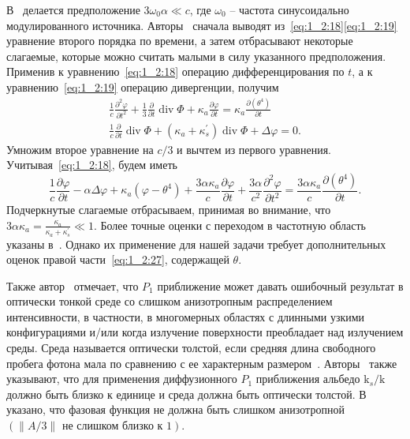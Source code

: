 В~\cite{FishkinGratton1993, HaskellEtAl1994} делается предположение
$3 \omega_{0} \alpha \ll c$, где $\omega_{0}$ -- частота
синусоидально модулированного источника.
Авторы~\cite{Boas1996, HaskellEtAl1994} сначала выводят
из~\eqref{eq:1_2:18}\eqref{eq:1_2:19} уравнение
второго порядка по времени,
а затем отбрасывают некоторые слагаемые, которые можно считать
малыми в силу указанного предположения.
Применив к уравнению~\eqref{eq:1_2:18} операцию дифференцирования
по $t$, а к уравнению~\eqref{eq:1_2:19} операцию дивергенции, получим
\[
    \begin{gathered}
        \frac{1}{c} \frac{\partial^{2} \varphi}{\partial t^{2}}+\frac{1}{3}
        \frac{\partial}{\partial t} \operatorname{div} \Phi+
        \kappa_{a} \frac{\partial \varphi}{\partial t}=\kappa_{a}
        \frac{\partial\left(\theta^{4}\right)}{\partial t} \\
        \frac{1}{c} \frac{\partial}{\partial t} \operatorname{div}
        \Phi+\left(\kappa_{a}+\kappa_{s}^{\prime}\right)
        \operatorname{div} \Phi+\Delta \varphi=0.
    \end{gathered}
\]
Умножим второе уравнение на $c/3$ и вычтем из первого уравнения.
Учитывая~\eqref{eq:1_2:18}, будем иметь
\begin{equation}
    \label{eq:1_2:27}
    \frac{1}{c} \frac{\partial \varphi}{\partial t}-\alpha \Delta
    \varphi+\kappa_{a}\left(\varphi-\theta^{4}\right)+\frac{3 \alpha \kappa_{a}}{c}
    \frac{\partial \varphi}{\partial t}+\frac{3 \alpha}{c^{2}}
    \frac{\partial^{2} \varphi}{\partial t^{2}}=\frac{3 \alpha \kappa_{a}}{c}
    \frac{\partial\left(\theta^{4}\right)}{\partial t}.
\end{equation}
Подчеркнутые слагаемые отбрасываем, принимая во внимание,
что $3 \alpha \kappa_{a}=\frac{\kappa_{a}}{\kappa_{a}+\kappa_{s}^{\prime}} \ll 1$.
Более точные оценки с переходом в частотную область указаны
в~\cite{Boas1996, FishkinGratton1993}.
Однако их применение для нашей задачи требует
дополнительных оценок правой части~\eqref{eq:1_2:27}, содержащей $\theta$.


Также автор~\cite[509]{modest2013radiative} отмечает, что $P_{1}$ приближение
может давать ошибочный результат в оптически тонкой среде со
слишком анизотропным распределением интенсивности, в частности,
в многомерных областях с длинными узкими конфигурациями
и/или когда излучение поверхности преобладает над излучением среды.
Среда называется оптически толстой, если средняя длина
свободного пробега фотона мала по сравнению
с ее характерным размером~\cite[343]{Ozisik1976}.
Авторы~\cite[228]{Keiz1972} также указывают,
что для применения диффузионного $P_{1}$ приближения альбедо
$\mathrm{k}_{s} / \mathrm{k}$ должно быть близко к единице и
среда должна быть оптически толстой.
В~\cite[8]{Boas1996} указано, что фазовая функция
не должна быть слишком анизотропной
$(\|A / 3\| \text{ не слишком близко к } 1)$.

